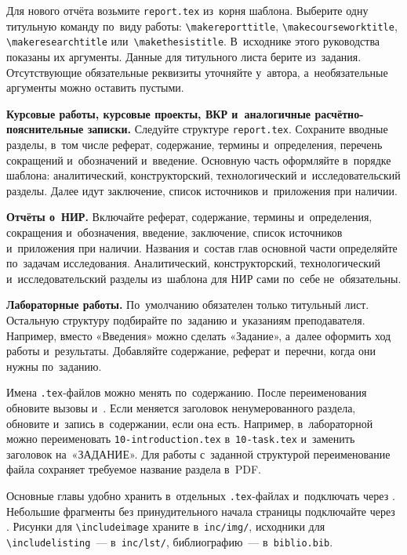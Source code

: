 \documentclass{bmstu}
\begin{document}
Для нового отчёта возьмите \texttt{report.tex} из~корня шаблона.
Выберите одну титульную команду по~виду работы: \verb|\makereporttitle|, \verb|\makecourseworktitle|, \verb|\makeresearchtitle| или~\verb|\makethesistitle|.
В~исходнике этого руководства показаны их аргументы.
Данные для титульного листа берите из~задания.
Отсутствующие обязательные реквизиты уточняйте у~автора, а~необязательные аргументы можно оставить пустыми.

\textbf{Курсовые работы, курсовые проекты, ВКР и~аналогичные расчётно-пояснительные записки.}
Следуйте структуре \texttt{report.tex}.
Сохраните вводные разделы, в~том числе реферат, содержание, термины и~определения, перечень сокращений и~обозначений и~введение.
Основную часть оформляйте в~порядке шаблона: аналитический, конструкторский, технологический и~исследовательский разделы.
Далее идут заключение, список источников и~приложения при наличии.

\textbf{Отчёты о~НИР.}
Включайте реферат, содержание, термины и~определения, сокращения и~обозначения, введение, заключение, список источников и~приложения при наличии.
Названия и~состав глав основной части определяйте по~задачам исследования.
Аналитический, конструкторский, технологический и~исследовательский разделы из~шаблона для НИР сами по~себе не~обязательны.

\textbf{Лабораторные работы.}
По~умолчанию обязателен только титульный лист.
Остальную структуру подбирайте по~заданию и~указаниям преподавателя.
Например, вместо «Введения» можно сделать «Задание», а~далее оформить ход работы и~результаты.
Добавляйте содержание, реферат и~перечни, когда они нужны по~заданию.

Имена \texttt{.tex}-файлов можно менять по~содержанию.
После переименования обновите вызовы \verb|| и~\verb||.
Если меняется заголовок ненумерованного раздела, обновите и~запись в~содержании, если она есть.
Например, в~лабораторной можно переименовать \texttt{10-introduction.tex} в~\texttt{10-task.tex} и~заменить заголовок на~«ЗАДАНИЕ».
Для работы с~заданной структурой переименование файла сохраняет требуемое название раздела в~PDF.

Основные главы удобно хранить в~отдельных \texttt{.tex}-файлах и~подключать через \verb||.
Небольшие фрагменты без принудительного начала страницы подключайте через \verb||.
Рисунки для \verb|\includeimage| храните в~\texttt{inc/img/}, исходники для \verb|\includelisting|~--- в~\texttt{inc/lst/}, библиографию~--- в~\texttt{biblio.bib}.
\end{document}
